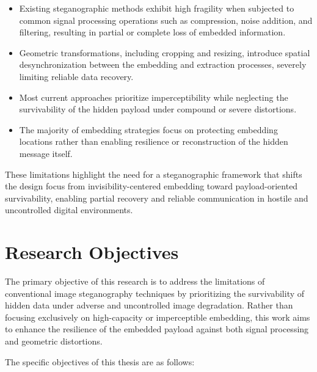 \documentclass[12pt,a4paper,oneside]{report}
\begin{document}
	\begin{itemize}
		\item Existing steganographic methods exhibit high fragility when subjected to common signal processing operations such as compression, noise addition, and filtering, resulting in partial or complete loss of embedded information.
		
		\item Geometric transformations, including cropping and resizing, introduce spatial desynchronization between the embedding and extraction processes, severely limiting reliable data recovery.
		
		\item Most current approaches prioritize imperceptibility while neglecting the survivability of the hidden payload under compound or severe distortions.
		
		\item The majority of embedding strategies focus on protecting embedding locations rather than enabling resilience or reconstruction of the hidden message itself.
	\end{itemize}
	
	These limitations highlight the need for a steganographic framework that shifts the design focus from invisibility-centered embedding toward payload-oriented survivability, enabling partial recovery and reliable communication in hostile and uncontrolled digital environments.
	
	
	\section{Research Objectives}
	
	The primary objective of this research is to address the limitations of conventional image steganography techniques by prioritizing the survivability of hidden data under adverse and uncontrolled image degradation. Rather than focusing exclusively on high-capacity or imperceptible embedding, this work aims to enhance the resilience of the embedded payload against both signal processing and geometric distortions.
	
	The specific objectives of this thesis are as follows:
	
\end{document}
